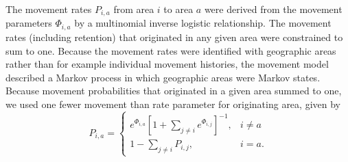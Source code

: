 \documentclass{article}
\begin{document}
The movement rates $P_{i, a}$ from area $i$ to area $a$ were derived from the movement parameters $\Phi_{i, a}$ by a multinomial inverse logistic relationship. The movement rates (including retention) that originated in any given area were constrained to sum to one. Because the movement rates were identified with geographic areas rather than for example individual movement histories, the movement model described a Markov process in which geographic areas were Markov states. Because movement probabilities that originated in a given area summed to one, we used one fewer movement than rate parameter for originating area, given by
% 
% 
% 
\begin{equation}
  \label{eq:movement-rates}
    P_{i,a} = 
    \begin{cases}
      e^{\Phi_{i,a}} \left[1 + \sum_{j \neq i}{e^{\Phi_{i,j}}} \right]^{-1} , &  i \neq a \\
      1 - \sum_{j \neq i}{P_{i,j}}, & i = a.
    \end{cases}
\end{equation} 
%
\end{document}
